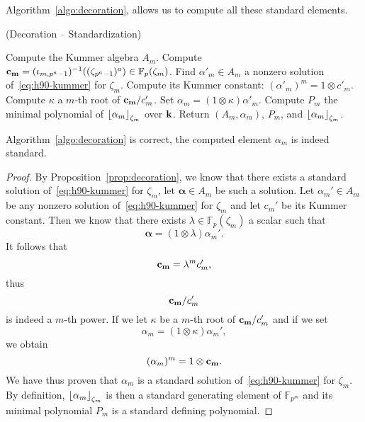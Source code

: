 Algorithm~\ref{algo:decoration}, allows us to compute all these standard
elements.
\begin{algorithm}
  \caption{(Decoration -- Standardization)}
  \label{algo:decoration}
  \begin{algorithmic}[1]
  \State Compute the Kummer algebra $A_m$.
  \State Compute $\mathbf{c_{m}}=(\iota_{m, p^a-1})^{-1}((\zeta_{p^a-1})^a)\in\mathbb{F}_p(\zeta_m)$.
  \State Find $\alpha'_m\in A_m$ a nonzero solution of~\eqref{eq:h90-kummer} for $\zeta_m$.
  \State Compute its Kummer constant: $(\alpha'_m)^m=1\otimes c'_m$.
  \State Compute $\kappa$ a $m$-th root of $\mathbf{c_{m}}/ c'_m$.
  \State Set $\alpha_{m}=(1\otimes\kappa)\alpha'_m$.
  \State Compute $P_m$ the minimal polynomial of $\left\lfloor \alpha_{m} \right\rfloor_{\zeta_m}$
  over $\mathbf{k}$.
  \State Return $(A_m,\alpha_m)$, $P_m$, and $\left\lfloor \alpha_m \right\rfloor_{\zeta_m}$.
  \end{algorithmic}
\end{algorithm}
\begin{prop}
  Algorithm~\ref{algo:decoration} is correct, \ie the computed element
  $\alpha_m$ is indeed standard. 
\end{prop}
\begin{proof}
  By Proposition~\ref{prop:decoration}, we know that there exists a standard
  solution of~\eqref{eq:h90-kummer} for $\zeta_m$, let $\pmb{\alpha}\in A_m$ be such a
  solution. Let $\alpha_m'\in A_m$ be any nonzero solution
  of~\eqref{eq:h90-kummer} for $\zeta_m$ and let $c_m'$ be its Kummer constant.
  Then we know that there exists $\lambda\in\mathbb{F}_p(\zeta_m)$ a scalar such that
  \[
    \pmb\alpha = (1\otimes\lambda)\alpha_m'.
  \]
  It follows that 
  \[
    \mathbf{c_{m}} = \lambda^m c_m',
  \]
  thus 
  \[
    \mathbf{c_{m}}/c_m'
  \]
  is indeed a $m$-th power. If we let $\kappa$ be a $m$-th root of
  $\mathbf{c_{m}}/c_m'$ and if we set 
  \[
    \alpha_m = (1\otimes\kappa)\alpha_m',
  \]
  we obtain
  \[
    (\alpha_m)^m = 1\otimes\mathbf{c_{m}}.
  \]
  We have thus proven that $\alpha_m$ is a standard solution
  of~\eqref{eq:h90-kummer} for $\zeta_m$. By definition,
  $\left\lfloor \alpha_m \right\rfloor_{\zeta_m}$ is then a standard generating element of
  $\mathbb{F}_{p^{m}}$ and its minimal polynomial $P_m$ is a standard defining
  polynomial.
\end{proof}

